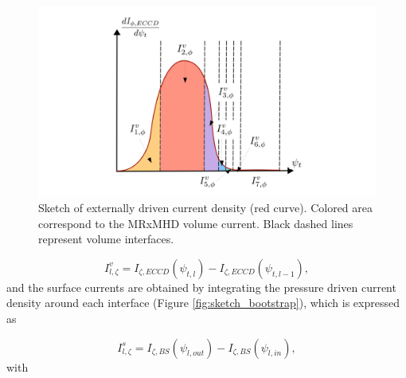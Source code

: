 \documentclass[my_thesis.tex]{subfiles}
\begin{document}
\begin{figure}
    \centering
    \includegraphics[width=\linewidth]{main/Figures_CurrentConstraint/ABaillod_fig3.pdf}
    \caption{Sketch of externally driven current density (red curve). Colored area correspond to the \ac{MRxMHD} volume current. Black dashed lines represent volume interfaces.}
    \label{fig:sketch_eccd}
\end{figure}


\begin{equation}
    I^v_{l,\zeta} = I_{\zeta,ECCD}(\psi_{t,l}) - I_{\zeta,ECCD}(\psi_{t,l-1}), \label{eq.rep_volume_current}
\end{equation}
and the surface currents are obtained by integrating the pressure driven current density around each interface (Figure \ref{fig:sketch_bootstrap}), which is expressed as

\begin{equation}
    I^s_{l,\zeta} = I_{\zeta,BS}(\psi_{l,out}) - I_{\zeta,BS}(\psi_{l,in}), \label{eq.rep_surface_current}
\end{equation}
with
\end{document}
